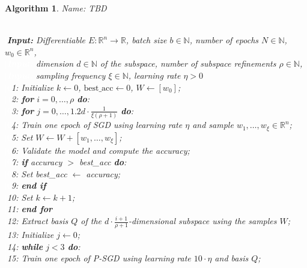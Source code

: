 \documentclass[11pt, a4paper]{article}
\newtheorem{algorithm}[theorem]{Algorithm}
\newcommand{\N}{\mathbb{N}}
\newcommand{\R}{\mathbb{R}}
\begin{document}
\begin{algorithm}
\caption{Name: TBD \textcolor{white}{$\Big |$}} \ \\
\textcolor{white}{$\Big |$}\textbf{Input:} Differentiable $E: \R^n \to \R$, batch size $b \in \N$, number of epochs $N \in \N$, $w_0 \in \R^n$, \\
\textcolor{white}{$\Big |$\textbf{Input:}} dimension $d \in \N$ of the subspace, number of subspace refinements $\rho \in \N$, \\ 
\textcolor{white}{$\Big |$\textbf{Input:}} sampling frequency $\xi \in \N$, learning rate $\eta > 0$ \\
\textcolor{white}{$\Big |0$}1: Initialize $k \leftarrow 0$, $\text{best\_acc} \leftarrow 0$, $W \leftarrow [ w_0 ]$; \\
\textcolor{white}{$\Big |1$}2: \textbf{for} $i=0, \dots, \rho$ \textbf{do}: \\
\textcolor{white}{$\Big |0$}3: \quad \textbf{for} $j=0, \dots, 1.2d \cdot \frac{1}{\xi(\rho+1)}$ \textbf{do}: \\
\textcolor{white}{$\Big |0$}4: \quad \quad Train one epoch of SGD using learning rate $\eta$ and sample $w_1, \dots, w_\xi \in \R^n$; \\
\textcolor{white}{$\Big |0$}5: \quad \quad Set $W \leftarrow W + [w_1, \dots, w_\xi]$; \\
\textcolor{white}{$\Big |0$}6: \quad \quad Validate the model and compute the accuracy; \\
\textcolor{white}{$\Big |0$}7: \quad \quad \textbf{if} accuracy $>$ best\_acc \textbf{do}: \\
\textcolor{white}{$\Big |0$}8: \quad \quad \quad Set best\_acc $\leftarrow$ accuracy; \\
\textcolor{white}{$\Big |0$}9: \quad \quad \textbf{end if} \\
\textcolor{white}{$\Big |$}10: \quad \quad Set $k \leftarrow k+1$; \\
\textcolor{white}{$\Big |$}11: \quad \textbf{end for} \\
\textcolor{white}{$\Big |$}12: \quad Extract basis $Q$ of the $d \cdot \frac{i+1}{\rho+1}$-dimensional subspace using the samples $W$; \\
\textcolor{white}{$\Big |$}13: \quad Initialize $j \leftarrow 0$; \\
\textcolor{white}{$\Big |$}14: \quad \textbf{while} $j<3$ \textbf{do}: \\
\textcolor{white}{$\Big |$}15: \quad \quad Train one epoch of P-SGD using learning rate $10\cdot\eta$ and basis $Q$; \\

\end{algorithm}
\end{document}
